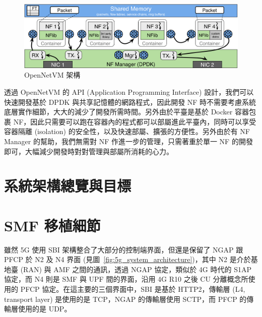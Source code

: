 \begin{figure}[htbp]
    \centering
    \includegraphics[height=!,width=1\linewidth,keepaspectratio=true]
                    {figures/netvm-arch.png}
                    \caption[OpenNetVM 架構]{{\footnotesize OpenNetVM 架構 \cite{onvm}}}
                    \label{fig:netvm_arch}
\end{figure}

透過 OpenNetVM 的 API (Application Programming Interface) 設計，我們可以快速開發基於 DPDK 與共享記憶體的網路程式，因此開發 NF 時不需要考慮系統底層實作細節，大大的減少了開發所需時間。另外由於平臺是基於 Docker 容器包裹 NF，因此只需要可以跑在容器內的程式都可以部屬進此平臺內，同時可以享受容器隔離 (isolation) 的安全性，以及快速部屬、擴張的方便性。另外由於有 NF Manager 的幫助，我們無需對 NF 作進一步的管理，只需著重於單一 NF 的開發即可，大幅減少開發時對對管理與部屬所消耗的心力。

\section{系統架構總覽與目標}
\label{sec:arch_intro}

\section{SMF 移植細節}
\label{sec:smf_porting}

雖然 5G 使用 SBI 架構整合了大部分的控制端界面，但還是保留了 NGAP 跟 PFCP 於 N2 及 N4 界面 (見圖~\ref{fig:5g_system_architecture})，其中 N2 是介於基地臺 (RAN) 與 AMF 之間的通訊，透過 NGAP 協定，類似於 4G 時代的 S1AP 協定，而 N4 則是 SMF 與 UPF 間的界面，沿用 4G R10 之後 CU 分離概念所使用的 PFCP 協定。在這主要的三個界面中，SBI 是基於 HTTP2，傳輸層 (L4, transport layer) 是使用的是 TCP，NGAP 的傳輸層使用 SCTP，而 PFCP 的傳輸層使用的是 UDP。

